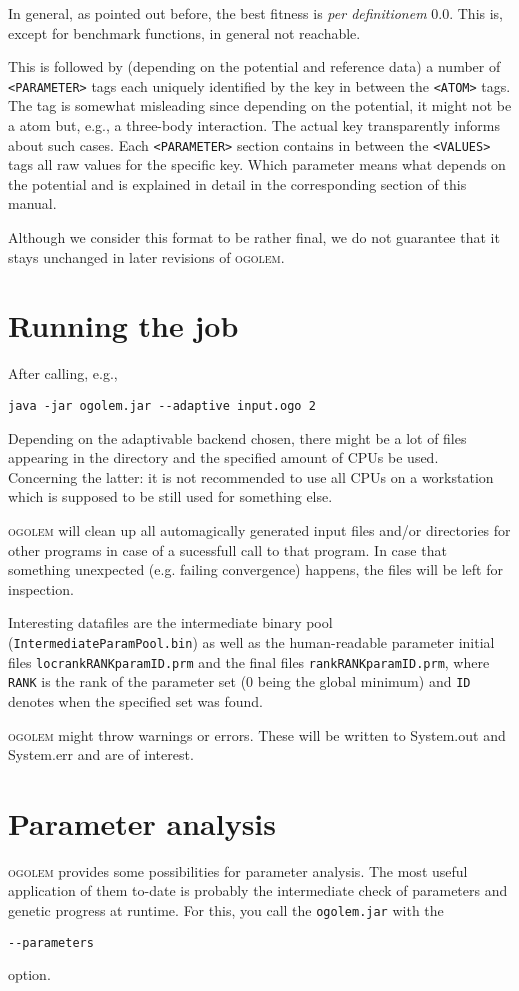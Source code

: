 \documentclass[a4paper,10pt]{scrbook}
\newcommand{\ogo}{\textsc{ogolem}}
\begin{document}
In general, as pointed out before, the best fitness is \emph{per definitionem}
0.0. This is, except for benchmark functions, in general not reachable.

This is followed by (depending on the potential and reference data) a number of
\texttt{<PARAMETER>} tags each uniquely identified by the key in between the
\texttt{<ATOM>} tags. The tag is somewhat misleading since depending on the
potential, it might not be a atom but, e.g., a three-body interaction. The
actual key transparently informs about such cases. Each \texttt{<PARAMETER>}
section contains in between the \texttt{<VALUES>} tags all raw values for the
specific key. Which parameter means what depends on the potential and is
explained in detail in the corresponding section of this manual.

Although we consider this format to be rather final, we do not guarantee that it
stays unchanged in later revisions of \ogo{}.

\section{Running the job}
After calling, e.g.,
\begin{verbatim}
java -jar ogolem.jar --adaptive input.ogo 2
\end{verbatim}
Depending on the adaptivable backend chosen, there might be a lot of files
appearing in the directory and the specified amount of CPUs be used. Concerning
the latter: it is not recommended to use all CPUs on a workstation which is
supposed to be still used for something else.

\ogo{} will clean up all automagically generated input files and/or directories
for other programs in case of a sucessfull call to that program. In case that
something unexpected (e.g. failing convergence) happens, the files will be left
for inspection.

Interesting datafiles are the intermediate binary pool
(\texttt{IntermediateParamPool.bin}) as well as the human-readable parameter
initial files \texttt{locrankRANKparamID.prm} and the final files
\texttt{rankRANKparamID.prm}, where \texttt{RANK} is the rank of the parameter
set (0 being the global minimum) and \texttt{ID} denotes when the specified set
was found.

\ogo{} might throw warnings or errors. These will be written to System.out and
System.err and are of interest.


\section{Parameter analysis}
\ogo{} provides some possibilities for parameter analysis. The most useful
application of them to-date is probably the intermediate check of parameters and
genetic progress at runtime. For this, you call the
\texttt{ogolem.jar} with the
\begin{verbatim}
--parameters
\end{verbatim}
option.
\end{document}
